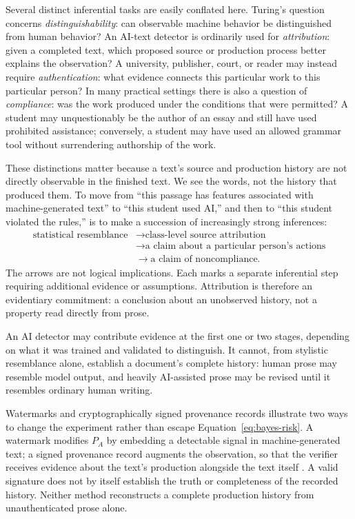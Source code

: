 \documentclass[pdflatex,sn-mathphys-num]{sn-jnl}
\begin{document}
Several distinct inferential tasks are easily conflated here. Turing's question concerns
\emph{distinguishability}: can observable machine behavior be distinguished from human behavior? An
AI-text detector is ordinarily used for \emph{attribution}: given a completed text, which proposed
source or production process better explains the observation? A university, publisher, court, or
reader may instead require \emph{authentication}: what evidence connects this particular work to
this particular person? In many practical settings there is also a question of \emph{compliance}:
was the work produced under the conditions that were permitted? A student may unquestionably be the
author of an essay and still have used prohibited assistance; conversely, a student may have used an
allowed grammar tool without surrendering authorship of the work.

These distinctions matter because a text's source and production history are not directly observable
in the finished text. We see the words, not the history that produced them. To move from ``this
passage has features associated with machine-generated text'' to ``this student used AI,'' and then
to ``this student violated the rules,'' is to make a succession of increasingly strong inferences:
\[
\begin{aligned}
\text{statistical resemblance}
&\longrightarrow \text{class-level source attribution}\\
&\longrightarrow \text{a claim about a particular person's actions}\\
&\longrightarrow \text{a claim of noncompliance}.
\end{aligned}
\]
The arrows are not logical implications. Each marks a separate inferential step requiring additional
evidence or assumptions. Attribution is therefore an evidentiary commitment: a conclusion about an unobserved history, not a
property read directly from prose.

An AI detector may contribute evidence at the first one or two stages, depending on what it was
trained and validated to distinguish. It cannot, from stylistic resemblance alone, establish a
document's complete history: human prose may resemble model output, and heavily AI-assisted prose
may be revised until it resembles ordinary human writing.

Watermarks and cryptographically signed provenance records illustrate two ways to change the
experiment rather than escape Equation~\eqref{eq:bayes-risk}. A watermark modifies \(P_A\) by embedding a
detectable signal in machine-generated text; a signed provenance record augments the observation,
so that the verifier receives evidence about the text's production alongside the text itself \cite{Kirchenbauer2023,C2PA2026}.
A valid signature does not by itself establish the truth or completeness of the recorded history.
Neither method reconstructs a complete production history from unauthenticated prose alone.
\end{document}
